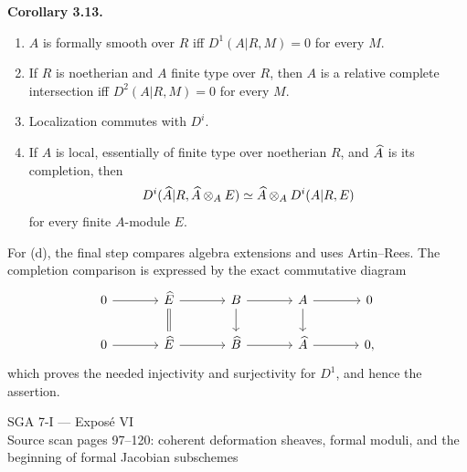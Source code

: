 \documentclass[11pt]{article}
\providecommand{\Aut}{\operatorname{Aut}}
\providecommand{\Spf}{\operatorname{Spf}}
\begin{document}
\textbf{Corollary 3.13.}
\begin{enumerate}[label=\textup{(\alph*)}]
\item \(A\) is formally smooth over \(R\) iff \(D^1(A|R,M)=0\) for every \(M\).
\item If \(R\) is noetherian and \(A\) finite type over \(R\), then \(A\) is a relative complete intersection iff \(D^2(A|R,M)=0\) for every \(M\).
\item Localization commutes with \(D^i\).
\item If \(A\) is local, essentially of finite type over noetherian \(R\), and \(\widehat A\) is its completion, then
\[
D^i(\widehat A|R,\widehat A\otimes_AE)\simeq \widehat A\otimes_AD^i(A|R,E)
\]
for every finite \(A\)-module \(E\).
\end{enumerate}
For (d), the final step compares algebra extensions and uses Artin--Rees.  The completion comparison is expressed by the exact commutative diagram
\[
\begin{tikzcd}[column sep=large]
0\arrow[r]&\Ehat\arrow[r]\arrow[d,equal]&B\arrow[r]\arrow[d]&A\arrow[r]\arrow[d]&0\\
0\arrow[r]&\Ehat\arrow[r]&\Bhat\arrow[r]&\Ahat\arrow[r]&0,
\end{tikzcd}
\]
which proves the needed injectivity and surjectivity for \(D^1\), and hence the assertion.



\providecommand{\Sing}{\operatorname{Sing}}
\providecommand{\Supp}{\operatorname{Supp}}
\providecommand{\depth}{\operatorname{depth}}
\providecommand{\Fitt}{\operatorname{Fitt}}
\providecommand{\Jac}{\operatorname{Jac}}
\providecommand{\sHom}{\mathcal Hom}
\providecommand{\RHom}{\operatorname{RHom}}
\providecommand{\Aut}{\operatorname{Aut}}
\providecommand{\Der}{\operatorname{Der}}
\providecommand{\Spf}{\operatorname{Spf}}
\providecommand{\cM}{\mathcal M}
\providecommand{\cB}{\mathcal B}
\providecommand{\cJ}{\mathcal J}
\providecommand{\cI}{\mathcal I}
\providecommand{\cL}{\mathcal L}
\providecommand{\cR}{\mathcal R}
\providecommand{\cT}{\mathcal T}
\providecommand{\cU}{\mathcal U}
\providecommand{\cV}{\mathcal V}
\providecommand{\kdual}{k[\varepsilon]}


\begin{center}
{\Large SGA 7-I — Exposé VI}\\[0.3em]
{\large Source scan pages 97--120: coherent deformation sheaves, formal moduli, and the beginning of formal Jacobian subschemes}
\end{center}
\end{document}
